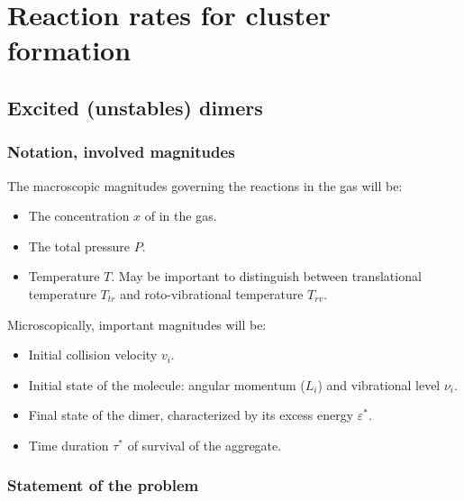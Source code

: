 \chapter{Reaction rates for cluster formation}
\label{C:react-rates-cluster}

\section{Excited (unstables) dimers}
\label{S:excit-unst-dimers}

\subsection{Notation, involved magnitudes}
\label{S:cant-de-inter}

The macroscopic magnitudes governing the reactions in the gas will be:
\begin{itemize}
\item The concentration $x$ of  in the gas.
\item The total pressure $P$.
\item Temperature $T$. May be important to distinguish between translational temperature $T_{tr}$ and roto-vibrational temperature $T_{rv}$.
\end{itemize}

Microscopically, important magnitudes will be:
\begin{itemize}
\item Initial collision velocity $v_{i}$.
\item Initial state of the molecule: angular momentum ($L_{i}$) and vibrational level $\nu_{i}$.
\item Final state of the dimer, characterized by its excess energy $\varepsilon^{*}$.
\item Time duration $\tau^{*}$ of survival of the aggregate.
\end{itemize}

\subsection{Statement of the problem}
\label{S:statement-problem}

